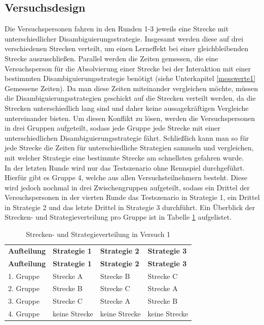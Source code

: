 \documentclass[12pt,a4paper]{scrartcl}
\begin{document}
\subsection{Versuchsdesign}
Die Versuchspersonen fahren in den Runden 1-3 jeweils eine Strecke mit unterschiedlicher Disambiguierungsstrategie. Insgesamt werden diese auf drei verschiedenen Strecken verteilt, um einen Lerneffekt bei einer gleichbleibenden Strecke auszuschließen. Parallel  werden die Zeiten gemessen, die eine Versuchsperson für die Absolvierung einer Strecke bei der Interaktion mit einer bestimmten Disambiguierungsstrategie benötigt (siehe Unterkapitel \ref{messwerte1} Gemessene Zeiten). Da man diese Zeiten miteinander vergleichen möchte, müssen die Disambiguierungsstrategien geschickt auf die Strecken verteilt werden, da die Strecken unterschiedlich lang sind und daher keine aussagekräftigen Vergleiche untereinander bieten. Um diesen Konflikt zu lösen, werden die Versuchspersonen in drei Gruppen aufgeteilt, sodass jede Gruppe jede Strecke mit einer unterschiedlichen Disambiguierungsstrategie fährt. Schließlich kann man so für jede Strecke die Zeiten für unterschiedliche Strategien sammeln und vergleichen, mit welcher Strategie eine bestimmte Strecke am schnellsten gefahren wurde. \\
In der letzten Runde wird nur das Testszenario ohne Rennspiel durchgeführt. Hierfür gibt es Gruppe 4, welche aus allen Versuchsteilnehmern besteht. Diese wird jedoch nochmal in drei Zwischengruppen aufgeteilt, sodass ein Drittel der Versuchspersonen in der vierten Runde das Testszenario in Strategie 1, ein Drittel in Strategie 2 und das letzte Drittel in Strategie 3 durchführt. Ein Überblick der Strecken- und Strategieverteilung pro Gruppe ist in Tabelle \ref{verteilung1} aufgelistet. 

\begin{longtable}{p{3cm}p{3cm}p{3cm}p{3cm} }
	\label{verteilung1}\\
	\caption[Strecken- und Strategieverteilung in Versuch 1]{Strecken- und Strategieverteilung in Versuch 1}\\
	\hline
	\textbf{Aufteilung}&\textbf{Strategie 1}&\textbf{Strategie 2} &\textbf{Strategie 3}\\
	\hline
	\endfirsthead
	\hline
	\textbf{Aufteilung}&\textbf{Strategie 1}&\textbf{Strategie 2} &\textbf{Strategie 3}\\
	\hline
	\endhead
1. Gruppe & Strecke A & Strecke B & Strecke C \\
2. Gruppe & Strecke B & Strecke C & Strecke A \\
3. Gruppe  & Strecke C & Strecke A & Strecke B \\
4. Gruppe   & keine Strecke & keine Strecke & keine Strecke\\ 
\hline
\end{longtable}
\end{document}
